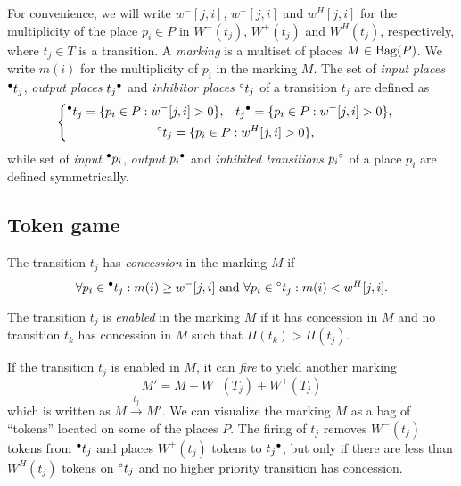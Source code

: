 For convenience, we will write $w^-[j, i]$, $w^+[j, i]$ and
$w^H[j, i]$ for the multiplicity of the place $p_i \in P$ in
$W^-(t_j)$, $W^+(t_j)$ and $W^H(t_j)$, respectively, where $t_j \in T$
is a transition. A \emph{marking} is a multiset of places
$M \in \operatorname{Bag}(P)$. We write $m(i)$ for the multiplicity of $p_i$ in the
marking $M$. The set of \emph{input places} ${}^\bullet t_j$,
\emph{output places} $t_j{}^\bullet$ and \emph{inhibitor places}
${}^\circ t_j$ of a transition $t_j$ are defined as
\begin{equation}
  \left\{ \begin{gathered}
    \begin{aligned}
      {}^\bullet t_j &= \{ p_i \in P : w^-[j, i] > 0 \}\text, &
      t_j{}^\bullet &= \{ p_i \in P : w^+[j, i] > 0 \}\text,
    \end{aligned} \\
    {}^\circ t_j = \{ p_i \in P : w^H[j, i] > 0 \}\text,
  \end{gathered} \right.
\end{equation}
while set of \emph{input} ${}^\bullet p_i$,
\emph{output} $p_i{}^\bullet$ and \emph{inhibited transitions}
$p_i{}^\circ$ of a place $p_i$ are defined symmetrically.

\subsection*{Token game}

\begin{dfn}
  The transition $t_j$ has \emph{concession} in the marking $M$ if
  \begin{equation}
    \forall p_i \in {}^\bullet t_j : m(i) \ge w^-[j, i] \text{ and }
    \forall p_i \in {}^\circ t_j : m(i) < w^H[j, i] \text.
  \end{equation}
\end{dfn}

\begin{dfn}
  The transition $t_j$ is \emph{enabled} in the marking $M$ if it has
  concession in $M$ and no transition $t_{k}$ has concession in $M$
  such that $\Pi(t_{k}) > \Pi(t_j)$.
\end{dfn}

If the transition $t_j$ is enabled in $M$, it can \emph{fire} to yield
another marking
\begin{equation}
  M' = M - W^-(T_j) + W^+(T_j)
\end{equation}
which is written as $M \xrightarrow{t_j} M'$. We can visualize the
marking $M$ as a bag of ``tokens'' located on some of the places
$P$. The firing of $t_j$ removes $W^-(t_j)$ tokens from
${}^\bullet t_j$ and places $W^{+}(t_j)$ tokens to $t_j{}^\bullet$,
but only if there are less than $W^H(t_j)$ tokens on ${}^\circ t_j$
and no higher priority transition has concession.

